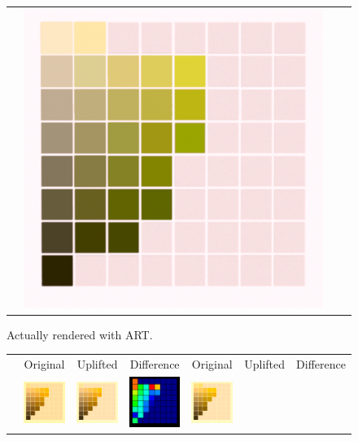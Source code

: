 \begin{figure}[t]
{\begin{tabular}{cccc}
			&
			\includegraphics[width=.30\linewidth]{img/results_art_page14_ourFL11.png}
		\end{tabular}
	}
	\caption{Actually rendered with ART.}
	\label{fig:results_art_page14}
\end{figure}


\begin{figure}[t!]
	\centering
	{\sffamily
		\setlength\tabcolsep{0.5pt}
		\begin{tabular}{ccccccc}
			&Original& Uplifted & Difference &\quad Original & Uplifted & Difference
			\vspace{1em} \\ 
			\raisebox{0.4cm}[0pt][0pt]{\parbox[c][0pt][c]{0cm}{\hspace{-1.5em}\\[20pt]}\par}
			&\includegraphics[width=.155\linewidth]{img/results_uplift_page09_originalFL11.png}
			&
			\includegraphics[width=.155\linewidth]{img/results_uplift_page09_sigmoidFL11.png}
			& 
			\includegraphics[width=.155\linewidth]{img/results_uplift_page09_diff_sigmoidFL11.png}
			&\quad
			\includegraphics[width=.155\linewidth]{img/results_uplift_page10_originalFL11.png}

\end{tabular}}
\end{figure}
